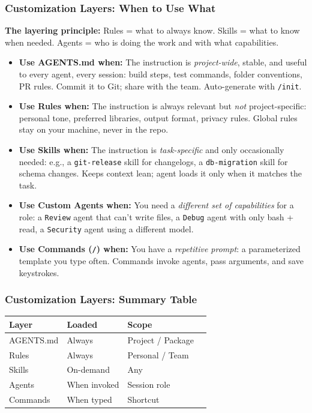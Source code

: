 \begin{frame}[fragile]\frametitle{Customization Layers:  When to Use What}

\textbf{The layering principle:} Rules = what to always know. Skills = what to know when needed. Agents = who is doing the work and with what capabilities.

  \begin{itemize}
    \item \textbf{Use AGENTS.md when:} The instruction is \textit{project-wide}, stable, and useful to every agent, every session:  build steps, test commands, folder conventions, PR rules. Commit it to Git; share with the team. Auto-generate with \texttt{/init}.
    \item \textbf{Use Rules when:} The instruction is always relevant but \textit{not} project-specific:  personal tone, preferred libraries, output format, privacy rules. Global rules stay on your machine, never in the repo.
    \item \textbf{Use Skills when:} The instruction is \textit{task-specific} and only occasionally needed:  e.g., a \texttt{git-release} skill for changelogs, a \texttt{db-migration} skill for schema changes. Keeps context lean; agent loads it only when it matches the task.
    \item \textbf{Use Custom Agents when:} You need a \textit{different set of capabilities} for a role:  a \texttt{Review} agent that can't write files, a \texttt{Debug} agent with only bash + read, a \texttt{Security} agent using a different model.
    \item \textbf{Use Commands (\texttt{/}) when:} You have a \textit{repetitive prompt}:  a parameterized template you type often. Commands invoke agents, pass arguments, and save keystrokes.
  \end{itemize}
\end{frame}

\begin{frame}[fragile]\frametitle{Customization Layers:  Summary Table}

      \begin{tabular}{|l|l|l|l|}
        \hline
        \textbf{Layer} & \textbf{Loaded} & \textbf{Scope}  \\
        \hline
        AGENTS.md & Always & Project / Package  \\
        Rules & Always & Personal / Team  \\
        Skills & On-demand & Any  \\
        Agents & When invoked & Session role \\
        Commands & When typed & Shortcut  \\
        \hline
      \end{tabular}

\end{frame}


